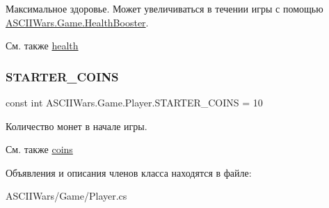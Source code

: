Максимальное здоровье. Может увеличиваться в течении игры с помощью \hyperlink{class_a_s_c_i_i_wars_1_1_game_1_1_health_booster}{A\+S\+C\+I\+I\+Wars.\+Game.\+Health\+Booster}. 

\begin{DoxySeeAlso}{См. также}
\hyperlink{class_a_s_c_i_i_wars_1_1_game_1_1_player_a8f364a47ef452b6c99bc13b7bdaae7ca}{health} 
\end{DoxySeeAlso}
\hypertarget{class_a_s_c_i_i_wars_1_1_game_1_1_player_af33b6af0d723918290a4a38aa4a6fb66}{}\label{class_a_s_c_i_i_wars_1_1_game_1_1_player_af33b6af0d723918290a4a38aa4a6fb66} 
\subsubsection{\texorpdfstring{S\+T\+A\+R\+T\+E\+R\+\_\+\+C\+O\+I\+NS}{STARTER\_COINS}}
{\footnotesize\ttfamily const int A\+S\+C\+I\+I\+Wars.\+Game.\+Player.\+S\+T\+A\+R\+T\+E\+R\+\_\+\+C\+O\+I\+NS = 10\hspace{0.3cm}{\ttfamily [private]}}



Количество монет в начале игры. 

\begin{DoxySeeAlso}{См. также}
\hyperlink{class_a_s_c_i_i_wars_1_1_game_1_1_player_a5abede19c5428143df924357ad475691}{coins} 
\end{DoxySeeAlso}


Объявления и описания членов класса находятся в файле\+:\begin{DoxyCompactItemize}
\item 
A\+S\+C\+I\+I\+Wars/\+Game/Player.\+cs\end{DoxyCompactItemize}
